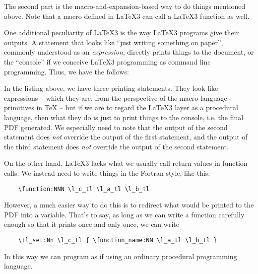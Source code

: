 \documentclass[hyperref, a4paper, 12pt]{article}
\begin{document}
The second part is the macro-and-expansion-based way to do things mentioned above.
Note that a macro defined in \LaTeX 3 can call a \LaTeX 3 function as well.

One additional peculiarity of \LaTeX 3 is the way \LaTeX 3 programs give their outputs.
A statement that looks like ``just writing something on paper'',
commonly understood as an \emph{expression},
directly prints things to the document,
or the ``console'' if we conceive \LaTeX 3 programming as command line programming.
Thus, we have the follows:


In the listing above, we have three printing statements.
They look like expressions
-- which they are, from the perspective of the macro language primitives in \TeX{}  --
but if we are to regard the \LaTeX 3 layer as a procedural language,
then what they do is just to print things to the console, i.e. the final PDF generated.
We especially need to note that the output of the second statement does \emph{not}
override the output of the first statement,
and the output of the third statement does \emph{not} override the output of the second statement.

On the other hand, \LaTeX 3 lacks what we usually call return values in function calls.
We instead need to write things in the Fortran style, like this:

\begin{lstlisting}
    \function:NNN \l_c_tl \l_a_tl \l_b_tl
\end{lstlisting}

However, a much easier way to do this is to redirect what would be printed to the PDF 
into a variable.
That's to say, as long as we can write a function carefully enough 
so that it prints once and only once,
we can write 

\begin{lstlisting}
    \tl_set:Nn \l_c_tl { \function_name:NN \l_a_tl \l_b_tl }
\end{lstlisting}

In this way we can program as if using an ordinary procedural programming language.
\end{document}
